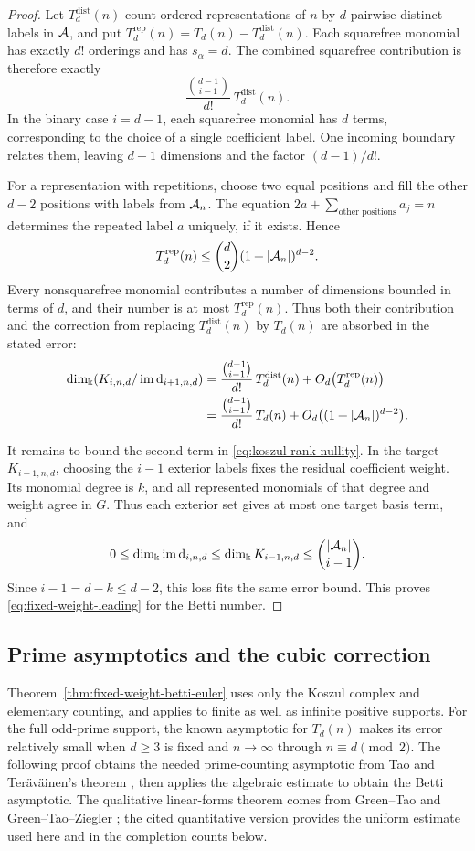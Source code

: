 \begin{proof}
Let $T_d^{\mathrm{dist}}(n)$ count ordered representations of $n$
by $d$ pairwise distinct labels in $\mathcal A$, and put
$T_d^{\mathrm{rep}}(n)=T_d(n)-T_d^{\mathrm{dist}}(n)$.
Each squarefree monomial has exactly $d!$ orderings and has
$s_\alpha=d$. The combined squarefree contribution is therefore exactly
\[
 \frac{\binom{d-1}{i-1}}{d!}\,T_d^{\mathrm{dist}}(n).
\]
In the binary case $i=d-1$, each squarefree monomial has $d$ terms,
corresponding to the choice of a single coefficient label. One incoming boundary relates them,
leaving $d-1$ dimensions and the factor $(d-1)/d!$.

For a representation with repetitions, choose two equal positions
and fill the other $d-2$ positions with labels from $\mathcal A_n$.
The equation $2a+\sum_{\text{other positions}}a_j=n$ determines
the repeated label $a$ uniquely, if it exists. Hence
\[
 T_d^{\mathrm{rep}}(n)
 \le\binom d2(1+|\mathcal A_n|)^{d-2}.
\]
Every nonsquarefree monomial contributes a number of dimensions
bounded in terms of $d$, and their number is at most
$T_d^{\mathrm{rep}}(n)$. Thus both their contribution and the
correction from replacing $T_d^{\mathrm{dist}}(n)$ by $T_d(n)$
are absorbed in the stated error:
\[
 \begin{aligned}
 \dim_\Bbbk(K_{i,n,d}/\operatorname{im}\mathrm{d}_{i+1,n,d})
 &=\frac{\binom{d-1}{i-1}}{d!}\,T_d^{\mathrm{dist}}(n)
       +O_d\bigl(T_d^{\mathrm{rep}}(n)\bigr)\\
 &=\frac{\binom{d-1}{i-1}}{d!}\,T_d(n)
       +O_d\bigl((1+|\mathcal A_n|)^{d-2}\bigr).
 \end{aligned}
\]

It remains to bound the second term in \eqref{eq:koszul-rank-nullity}.
In the target $K_{i-1,n,d}$, choosing the $i-1$ exterior labels fixes the residual
coefficient weight. Its monomial degree is $k$, and all represented
monomials of that degree and weight agree in $G$. Thus each exterior set gives
at most one target basis term, and
\[
 0\le\dim_\Bbbk\operatorname{im}\mathrm d_{i,n,d}
 \le\dim_\Bbbk K_{i-1,n,d}\le\binom{|\mathcal A_n|}{i-1}.
\]
Since $i-1=d-k\le d-2$, this loss fits the same error bound.
This proves \eqref{eq:fixed-weight-leading} for the Betti number.

\end{proof}

\subsection{Prime asymptotics and the cubic correction}

Theorem~\ref{thm:fixed-weight-betti-euler} uses only the Koszul complex
and elementary counting, and applies to finite as well as infinite
positive supports. For the full odd-prime support, the known
asymptotic for $T_d(n)$ makes its error relatively small when $d\ge3$
is fixed and $n\to\infty$ through $n\equiv d\pmod2$.
The following proof obtains the needed prime-counting asymptotic from
Tao and Ter\"av\"ainen's theorem \cite[Theorem~1.6]{TT}, then applies
the algebraic estimate to obtain the Betti asymptotic. The qualitative
linear-forms theorem comes from Green--Tao \cite{GT10,GT12} and
Green--Tao--Ziegler \cite{GTZ12}; the cited quantitative version
provides the uniform estimate used here and in the completion counts
below.


